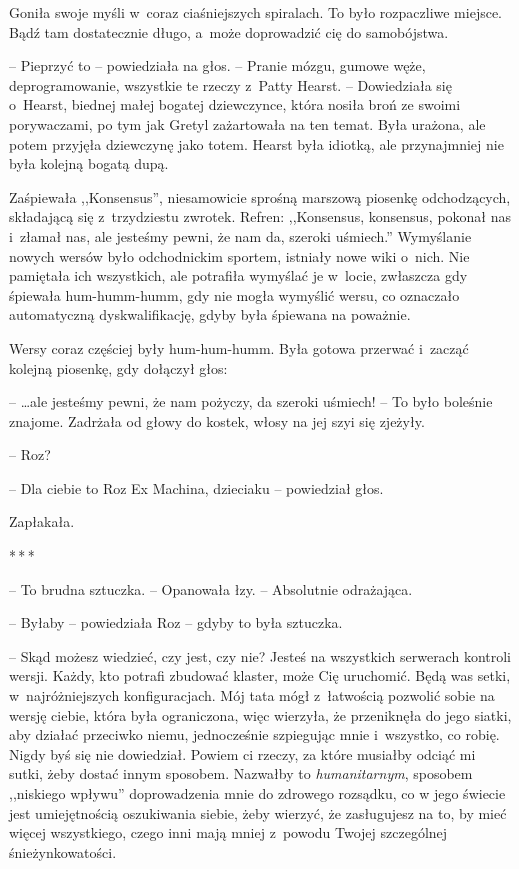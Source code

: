 \documentclass[oneside,polish,11pt,sfheadings]{mwbk}
\newcommand{\threeast}{\bigskip\par\centerline{*\,*\,*}\medskip\par}
\begin{document}
Goniła swoje myśli w~coraz ciaśniejszych spiralach. To było rozpaczliwe
miejsce. Bądź tam dostatecznie długo, a~może doprowadzić cię do
samobójstwa.

-- Pieprzyć to -- powiedziała na głos. -- Pranie mózgu, gumowe węże,
deprogramowanie, wszystkie te rzeczy z~Patty Hearst. -- Dowiedziała się o~Hearst, biednej małej bogatej dziewczynce, która nosiła broń ze swoimi
porywaczami, po tym jak Gretyl zażartowała na ten temat. Była urażona,
ale potem przyjęła dziewczynę jako totem. Hearst była idiotką, ale
przynajmniej nie była kolejną bogatą dupą.

Zaśpiewała ,,Konsensus'', niesamowicie sprośną marszową piosenkę
odchodzących, składającą się z~trzydziestu zwrotek. Refren: ,,Konsensus,
konsensus, pokonał nas i~złamał nas, ale jesteśmy pewni, że nam da,
szeroki uśmiech.'' Wymyślanie nowych wersów było odchodnickim sportem,
istniały nowe wiki o~nich. Nie pamiętała ich wszystkich, ale potrafiła
wymyślać je w~locie, zwłaszcza gdy śpiewała hum-humm-humm, gdy nie mogła
wymyślić wersu, co oznaczało automatyczną dyskwalifikację, gdyby była
śpiewana na poważnie.

Wersy coraz częściej były hum-hum-humm. Była gotowa przerwać i~zacząć
kolejną piosenkę, gdy dołączył głos: 

-- \ldots  ale jesteśmy pewni, że nam pożyczy, da szeroki uśmiech! -- To było boleśnie znajome. Zadrżała od głowy do kostek, włosy na jej szyi się zjeżyły.

-- Roz?

-- Dla ciebie to Roz Ex Machina, dzieciaku -- powiedział głos.

Zapłakała.

\threeast

-- To brudna sztuczka. -- Opanowała łzy. -- Absolutnie odrażająca.

-- Byłaby -- powiedziała Roz -- gdyby to była sztuczka.

-- Skąd możesz wiedzieć, czy jest, czy nie? Jesteś na wszystkich
serwerach kontroli wersji. Każdy, kto potrafi zbudować klaster, może Cię
uruchomić. Będą was setki, w~najróżniejszych konfiguracjach. Mój tata
mógł z~łatwością pozwolić sobie na wersję ciebie, która była
ograniczona, więc wierzyła, że przeniknęła do jego siatki, aby działać
przeciwko niemu, jednocześnie szpiegując mnie i~wszystko, co robię.
Nigdy byś się nie dowiedział. Powiem ci rzeczy, za które musiałby odciąć
mi sutki, żeby dostać innym sposobem. Nazwałby to \textit{humanitarnym},
sposobem ,,niskiego wpływu'' doprowadzenia mnie do zdrowego rozsądku, co
w jego świecie jest umiejętnością oszukiwania siebie, żeby wierzyć, że
zasługujesz na to, by mieć więcej wszystkiego, czego inni mają mniej z~powodu Twojej szczególnej śnieżynkowatości.
\end{document}
